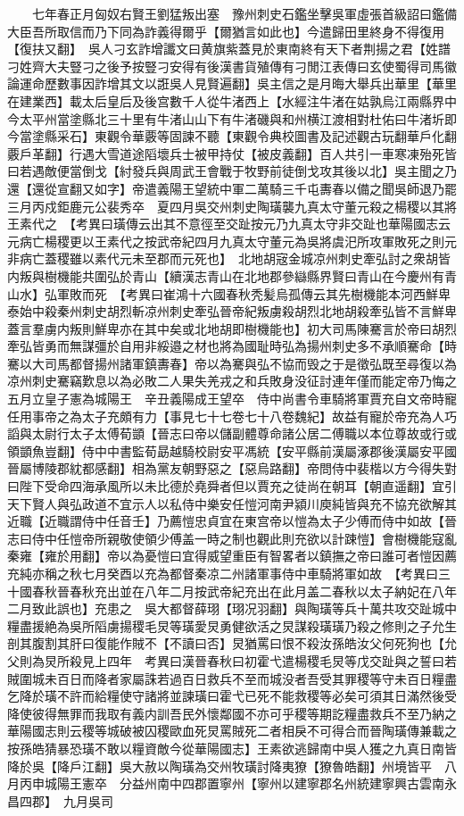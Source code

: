 　　七年春正月匈奴右賢王劉猛叛出塞　豫州刺史石鑑坐擊吳軍虛張首級詔曰鑑備大臣吾所取信而乃下同為詐義得爾乎【爾猶言如此也】今遣歸田里終身不得復用【復扶又翻】　吳人刁玄詐增讖文曰黄旗紫蓋見於東南終有天下者荆揚之君【姓譜刁姓齊大夫豎刁之後予按豎刁安得有後漢書貨殖傳有刁閒江表傳曰玄使蜀得司馬徽論運命歷數事因詐增其文以誑吳人見賢遍翻】吳主信之是月晦大舉兵出華里【華里在建業西】載太后皇后及後宫數千人從牛渚西上【水經注牛渚在姑孰烏江兩縣界中今太平州當塗縣北三十里有牛渚山山下有牛渚磯與和州横江渡相對杜佑曰牛渚圻即今當塗縣采石】東觀令華覈等固諫不聽【東觀令典校圖書及記述觀古玩翻華戶化翻覈戶革翻】行遇大雪道途䧟壞兵士被甲持仗【被皮義翻】百人共引一車寒凍殆死皆曰若遇敵便當倒戈【紂發兵與周武王會戰于牧野前徒倒戈攻其後以北】吳主聞之乃還【還從宣翻又如字】帝遣義陽王望統中軍二萬騎三千屯夀春以備之聞吳師退乃罷　三月丙戍鉅鹿元公裴秀卒　夏四月吳交州刺史陶璜襲九真太守董元殺之楊稷以其將王素代之　【考異曰璜傳云出其不意徑至交趾按元乃九真太守非交趾也華陽國志云元病亡楊稷更以王素代之按武帝紀四月九真太守董元為吳將虞汜所攻軍敗死之則元非病亡蓋稷雖以素代元未至郡而元死也】　北地胡宼金城凉州刺史牽弘討之衆胡皆内叛與樹機能共圍弘於青山【續漢志青山在北地郡參䜌縣界賢曰青山在今慶州有青山水】弘軍敗而死　【考異曰崔鴻十六國春秋秃髪烏孤傳云其先樹機能本河西鮮卑泰始中殺秦州刺史胡烈斬凉州刺史牽弘晉帝紀叛虜殺胡烈北地胡殺牽弘皆不言鮮卑蓋言羣虜内叛則鮮卑亦在其中矣或北地胡即樹機能也】初大司馬陳騫言於帝曰胡烈牽弘皆勇而無謀彊於自用非綏邉之材也將為國耻時弘為揚州刺史多不承順騫命【時騫以大司馬都督揚州諸軍鎮夀春】帝以為騫與弘不協而毁之于是徵弘既至尋復以為凉州刺史騫竊歎息以為必敗二人果失羌戎之和兵敗身没征討連年僅而能定帝乃悔之　五月立皇子憲為城陽王　辛丑義陽成王望卒　侍中尚書令車騎將軍賈充自文帝時寵任用事帝之為太子充頗有力【事見七十七卷七十八卷魏紀】故益有寵於帝充為人巧謟與太尉行太子太傅荀顗【晉志曰帝以儲副體尊命諸公居二傅職以本位尊故或行或領顗魚豈翻】侍中中書監荀勗越騎校尉安平馮統【安平縣前漢屬涿郡後漢屬安平國晉屬博陵郡紞都感翻】相為黨友朝野惡之【惡烏路翻】帝問侍中裴楷以方今得失對曰陛下受命四海承風所以未比德於堯舜者但以賈充之徒尚在朝耳【朝直遥翻】宜引天下賢人與弘政道不宜示人以私侍中樂安任愷河南尹潁川庾純皆與充不協充欲解其近職【近職謂侍中任音壬】乃薦愷忠貞宜在東宫帝以愷為太子少傅而侍中如故【晉志曰侍中任愷帝所親敬使領少傅盖一時之制也觀此則充欲以計踈愷】會樹機能寇亂秦雍【雍於用翻】帝以為憂愷曰宜得威望重臣有智畧者以鎮撫之帝曰誰可者愷因薦充純亦稱之秋七月癸酉以充為都督秦凉二州諸軍事侍中車騎將軍如故　【考異曰三十國春秋晉春秋充出並在八年二月按武帝紀充出在此月盖二春秋以太子納妃在八年二月致此誤也】充患之　吳大都督薛珝【珝况羽翻】與陶璜等兵十萬共攻交趾城中糧盡援絶為吳所䧟虜揚稷毛炅等璜愛炅勇健欲活之炅謀殺璜璜乃殺之修則之子允生剖其腹割其肝曰復能作賊不【不讀曰否】炅猶罵曰恨不殺汝孫皓汝父何死狗也【允父則為炅所殺見上四年　考異曰漢晉春秋曰初霍弋遣楊稷毛炅等戊交趾與之誓曰若賊圍城未百日而降者家屬誅若過百日救兵不至而城没者吾受其罪稷等守未百日糧盡乞降於璜不許而給糧使守諸將並諫璜曰霍弋已死不能救稷等必矣可須其日滿然後受降使彼得無罪而我取有義内訓吾民外懷鄰國不亦可乎稷等期訖糧盡救兵不至乃納之華陽國志則云稷等城破被囚稷歐血死炅罵賊死二者相戾不可得合而晉陶璜傳兼載之按孫皓猜暴恐璜不敢以糧資敵今從華陽國志】王素欲逃歸南中吳人獲之九真日南皆降於吳【降戶江翻】吳大赦以陶璜為交州牧璜討降夷獠【獠魯皓翻】州境皆平　八月丙申城陽王憲卒　分益州南中四郡置寧州【寧州以建寧郡名州統建寧興古雲南永昌四郡】　九月吳司